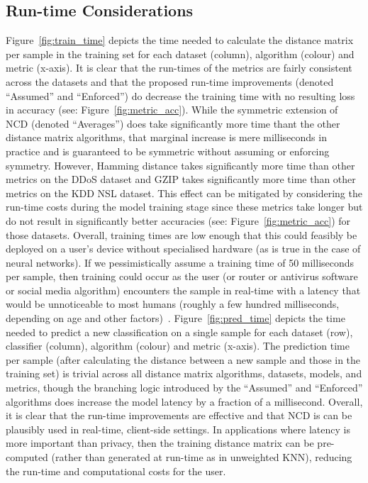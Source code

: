 \documentclass[conference]{IEEEtran}
\begin{document}
\subsection{Run-time Considerations}

Figure~\ref{fig:train_time} depicts the time needed to calculate the distance matrix per sample in the training set for each dataset (column), algorithm (colour) and metric (x-axis). 
It is clear that the run-times of the metrics are fairly consistent across the datasets and that the proposed run-time improvements (denoted ``Assumed'' and ``Enforced'') do decrease the training time with no resulting loss in accuracy (see: Figure~\ref{fig:metric_acc}). 
While the symmetric extension of NCD (denoted ``Averages'') does take significantly more time thant the other distance matrix algorithms, that marginal increase is mere milliseconds in practice and is guaranteed to be symmetric without assuming or enforcing symmetry. 
However, Hamming distance takes significantly more time than other metrics on the DDoS dataset and GZIP takes significantly more time than other metrics on the KDD NSL dataset. 
This effect can be mitigated by considering the run-time costs during the model training stage since these metrics take longer but do not result in significantly better accuracies (see: Figure~\ref{fig:metric_acc}) for those datasets. 
Overall, training times are low enough that this could feasibly be deployed on a user's device without specialised hardware (as is true in the case of neural networks). 
If we pessimistically assume a training time of 50 milliseconds per sample, then training could occur as the user (or router or antivirus software or social media algorithm) encounters the sample in real-time with a latency that would be unnoticeable to most humans (roughly a few hundred milliseconds, depending on age and other factors)~\cite{reaction_time}. 
Figure~\ref{fig:pred_time} depicts the time needed to predict a new classification on a single sample for each dataset (row), classifier (column), algorithm (colour) and metric (x-axis). 
The prediction time per sample (after calculating the distance between a new sample and those in the training set) is trivial across all distance matrix algorithms, datasets, models, and metrics, though the branching logic introduced by the ``Assumed'' and ``Enforced'' algorithms does increase the model latency by a fraction of a millisecond.
Overall, it is clear that the run-time improvements are effective and that NCD is can be plausibly used in real-time, client-side settings. 
In applications where latency is more important than privacy, then the training distance matrix can be pre-computed (rather than generated at run-time as in unweighted KNN), reducing the run-time and computational costs for the user. 
\end{document}
